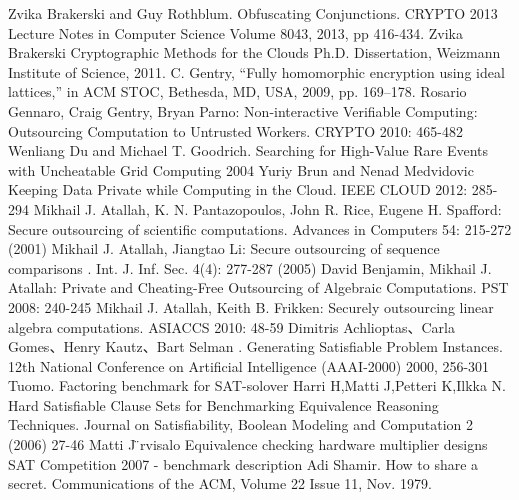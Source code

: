 \documentclass[runningheads,a4paper]{llncs}
\begin{document}
\newline[13]	Zvika Brakerski and Guy Rothblum. Obfuscating Conjunctions. CRYPTO 2013 Lecture Notes in Computer Science Volume 8043, 2013, pp 416-434. 
\newline[14]	Zvika Brakerski Cryptographic Methods for the Clouds Ph.D. Dissertation, Weizmann Institute of Science, 2011.
\newline[15]	C. Gentry, “Fully homomorphic encryption using ideal lattices,” in ACM STOC, Bethesda, MD, USA, 2009, pp. 169–178.
\newline[16]	Rosario Gennaro, Craig Gentry, Bryan Parno: Non-interactive Verifiable Computing: Outsourcing Computation to Untrusted Workers. CRYPTO 2010: 465-482
\newline[17]	Wenliang Du and Michael T. Goodrich. Searching for High-Value Rare Events with Uncheatable Grid Computing  2004
\newline[18]	Yuriy Brun and Nenad Medvidovic Keeping Data Private while Computing in the Cloud. IEEE CLOUD 2012: 285-294
\newline[19]	Mikhail J. Atallah, K. N. Pantazopoulos, John R. Rice, Eugene H. Spafford: Secure outsourcing of scientific computations. Advances in Computers 54: 215-272 (2001)
\newline[20]	Mikhail J. Atallah, Jiangtao Li: Secure outsourcing of sequence comparisons . Int. J. Inf. Sec. 4(4): 277-287 (2005)
\newline[21]	David Benjamin, Mikhail J. Atallah: Private and Cheating-Free Outsourcing of Algebraic Computations. PST 2008: 240-245
\newline[22]	Mikhail J. Atallah, Keith B. Frikken: Securely outsourcing linear algebra computations. ASIACCS 2010: 48-59
\newline[23]	Dimitris Achlioptas、Carla Gomes、Henry Kautz、Bart Selman . Generating Satisfiable Problem Instances. 12th National Conference on Artificial Intelligence (AAAI-2000) 2000, 256-301
\newline[24]	Tuomo. Factoring benchmark for SAT-solover
\newline[25]	Harri H,Matti J,Petteri K,Ilkka N. Hard Satisfiable Clause Sets for Benchmarking Equivalence Reasoning Techniques. Journal on Satisfiability, Boolean Modeling and Computation 2 (2006) 27-46
\newline[26]	Matti J ̈rvisalo  Equivalence checking hardware multiplier designs SAT Competition 2007 - benchmark description
\newline[27]	Adi Shamir. How to share a secret. Communications of the ACM, Volume 22 Issue 11, Nov. 1979.
\end{document}
